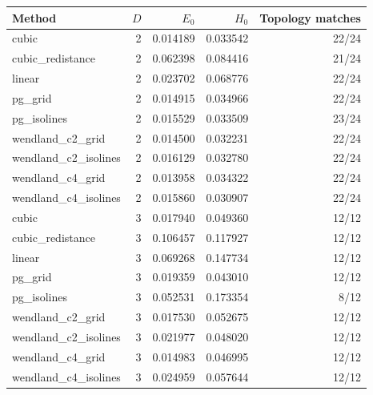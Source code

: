 \begin{tabular}{lrrrr}\toprule
Method & $D$ & $E_0$ & $H_0$ & Topology matches \\ \midrule
cubic & 2 & 0.014189 & 0.033542 & 22/24 \\
cubic\_redistance & 2 & 0.062398 & 0.084416 & 21/24 \\
linear & 2 & 0.023702 & 0.068776 & 22/24 \\
pg\_grid & 2 & 0.014915 & 0.034966 & 22/24 \\
pg\_isolines & 2 & 0.015529 & 0.033509 & 23/24 \\
wendland\_c2\_grid & 2 & 0.014500 & 0.032231 & 22/24 \\
wendland\_c2\_isolines & 2 & 0.016129 & 0.032780 & 22/24 \\
wendland\_c4\_grid & 2 & 0.013958 & 0.034322 & 22/24 \\
wendland\_c4\_isolines & 2 & 0.015860 & 0.030907 & 22/24 \\
cubic & 3 & 0.017940 & 0.049360 & 12/12 \\
cubic\_redistance & 3 & 0.106457 & 0.117927 & 12/12 \\
linear & 3 & 0.069268 & 0.147734 & 12/12 \\
pg\_grid & 3 & 0.019359 & 0.043010 & 12/12 \\
pg\_isolines & 3 & 0.052531 & 0.173354 & 8/12 \\
wendland\_c2\_grid & 3 & 0.017530 & 0.052675 & 12/12 \\
wendland\_c2\_isolines & 3 & 0.021977 & 0.048020 & 12/12 \\
wendland\_c4\_grid & 3 & 0.014983 & 0.046995 & 12/12 \\
wendland\_c4\_isolines & 3 & 0.024959 & 0.057644 & 12/12 \\
\bottomrule\end{tabular}
